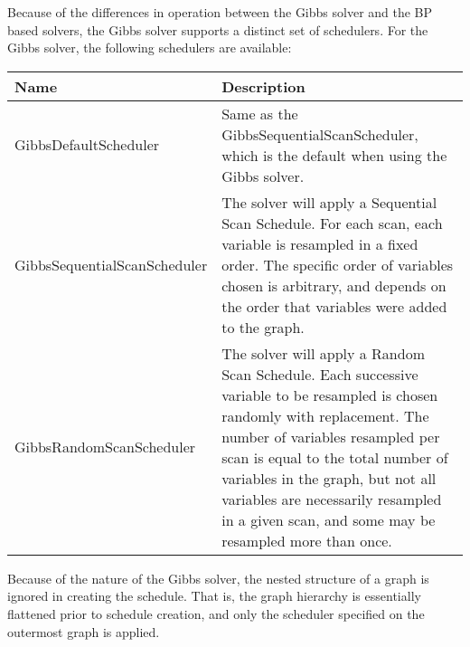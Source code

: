 Because of the differences in operation between the Gibbs solver and the BP based solvers, the Gibbs solver supports a distinct set of schedulers.  For the Gibbs solver, the following schedulers are available:

\begin{tabular}{l p{4in}}
\textbf{Name} & \textbf{Description} \\ \hline \hline
%
\textsf{GibbsDefaultScheduler} & Same as the GibbsSequentialScanScheduler, which is the default when using the Gibbs solver. \\ \hline
%
\textsf{GibbsSequentialScanScheduler} & The solver will apply a Sequential Scan Schedule.  For each scan, each variable is resampled in a fixed order.  The specific order of variables chosen is arbitrary, and depends on the order that variables were added to the graph. \\ \hline
%
\textsf{GibbsRandomScanScheduler} & The solver will apply a Random Scan Schedule.  Each successive variable to be resampled is chosen randomly with replacement.  The number of variables resampled per scan is equal to the total number of variables in the graph, but not all variables are necessarily resampled in a given scan, and some may be resampled more than once. \\ \hline
%
\end{tabular}

Because of the nature of the Gibbs solver, the nested structure of a graph is ignored in creating the schedule.  That is, the graph hierarchy is essentially flattened prior to schedule creation, and only the scheduler specified on the outermost graph is applied.

